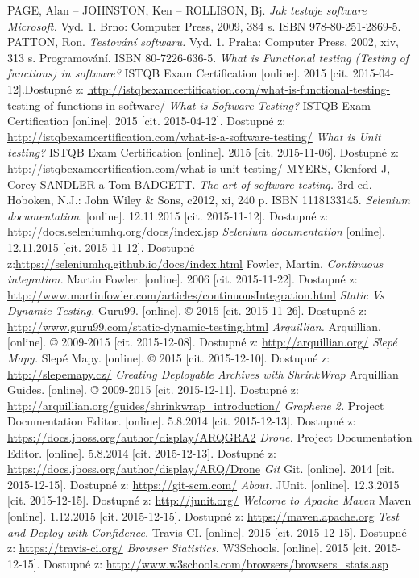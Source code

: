 \documentclass[
    color,   %
	table,   %
    twoside, %
]{fithesis3}
\begin{document}
\begin{thebibliography}{9}
PAGE, Alan – JOHNSTON, Ken – ROLLISON, Bj. \emph{Jak testuje software Microsoft.} Vyd. 1. Brno: Computer Press, 2009, 384 s. ISBN 978-80-251-2869-5.
PATTON, Ron. \emph{Testování softwaru.} Vyd. 1. Praha: Computer Press, 2002, xiv, 313 s. Programování. ISBN 80-7226-636-5. 
\emph{What is Functional testing (Testing of functions) in software?} ISTQB Exam Certification [online]. 2015 [cit. 2015-04-12].Dostupné z: \url{http://istqbexamcertification.com/what-is-functional-testing-testing-of-functions-in-software/}
\emph{What is Software Testing?} ISTQB Exam Certification [online]. 2015 [cit. 2015-04-12]. Dostupné z: \url{http://istqbexamcertification.com/what-is-a-software-testing/}
\emph{What is Unit testing?} ISTQB Exam Certification [online]. 2015 [cit. 2015-11-06]. Dostupné z: \url{http://istqbexamcertification.com/what-is-unit-testing/}
MYERS, Glenford J, Corey SANDLER a Tom BADGETT. \emph{The art of software testing.} 3rd ed. Hoboken, N.J.: John Wiley \& Sons, c2012, xi, 240 p. ISBN 1118133145.
\emph{Selenium documentation.} [online]. 12.11.2015 [cit. 2015-11-12]. Dostupné z: \url{http://docs.seleniumhq.org/docs/index.jsp}
\emph{Selenium documentation} [online]. 12.11.2015 [cit. 2015-11-12]. Dostupné z:\url{https://seleniumhq.github.io/docs/index.html}
Fowler, Martin. \emph{Continuous integration.} Martin Fowler. [online]. 2006 [cit. 2015-11-22]. Dostupné z: \url{http://www.martinfowler.com/articles/continuousIntegration.html}
\emph{Static Vs Dynamic Testing.} Guru99. [online]. © 2015 [cit. 2015-11-26]. Dostupné z: \url{http://www.guru99.com/static-dynamic-testing.html}
\emph{Arquillian.} Arquillian. [online]. © 2009-2015 [cit. 2015-12-08]. Dostupné z: \url{http://arquillian.org/}
\emph{Slepé Mapy.} Slepé Mapy. [online]. © 2015 [cit. 2015-12-10]. Dostupné z: \url{http://slepemapy.cz/}
\emph{Creating Deployable Archives with ShrinkWrap} Arquillian Guides. [online]. © 2009-2015 [cit. 2015-12-11]. Dostupné z: \url{http://arquillian.org/guides/shrinkwrap_introduction/}
\emph{Graphene 2.} Project Documentation Editor. [online]. 5.8.2014 [cit. 2015-12-13]. Dostupné z: \url{https://docs.jboss.org/author/display/ARQGRA2}
\emph{Drone.} Project Documentation Editor. [online]. 5.8.2014 [cit. 2015-12-13]. Dostupné z: \url{https://docs.jboss.org/author/display/ARQ/Drone}
\emph{Git} Git. [online]. 2014 [cit. 2015-12-15]. Dostupné z: \url{https://git-scm.com/}
\emph{About.} JUnit. [online]. 12.3.2015 [cit. 2015-12-15]. Dostupné z: \url{http://junit.org/}
\emph{Welcome to Apache Maven} Maven [online]. 1.12.2015 [cit. 2015-12-15]. Dostupné z: \url{https://maven.apache.org}
\emph{Test and Deploy with Confidence.} Travis CI. [online]. 2015 [cit. 2015-12-15]. Dostupné z: \url{https://travis-ci.org/}
\emph{Browser Statistics.} W3Schools. [online]. 2015 [cit. 2015-12-15]. Dostupné z: \url{http://www.w3schools.com/browsers/browsers_stats.asp}
\end{thebibliography}
\end{document}
